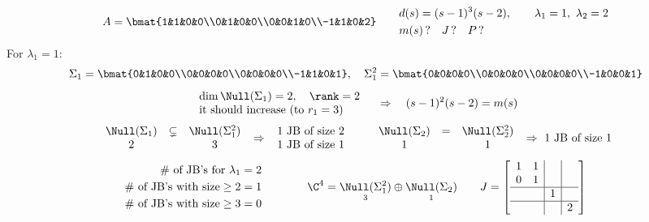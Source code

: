 \begin{example}
\[
A=\bmat{1&1&0&0\\0&1&0&0\\0&0&1&0\\-1&1&0&2}
\qquad
\begin{aligned}
&d(s)=(s-1)^3(s-2),\qquad \lambda_1=1,\ \lambda_2=2\\
&m(s)\,?\quad J\,?\quad P\,?
\end{aligned}
\]
For $\lambda_1=1$:
\[
\Sigma_1=\bmat{0&1&0&0\\0&0&0&0\\0&0&0&0\\-1&1&0&1},
\quad
\Sigma_1^2=\bmat{0&0&0&0\\0&0&0&0\\0&0&0&0\\-1&0&0&1}
\]
\[
\begin{array}{l}\dim\Null(\Sigma_1)=2,\quad \rank=2\\ \text{it should increase (to }r_1=3)\end{array}
\quad\Rightarrow\quad (s-1)^2(s-2)=m(s)
\]
\[
\begin{array}{ccc}
\Null(\Sigma_1)&\subsetneq&\Null(\Sigma_1^2)\\
2&&3
\end{array}
\ \Rightarrow\
\begin{array}{l}
\text{1 JB of size 2}\\ \text{1 JB of size 1}
\end{array}
\qquad
\begin{array}{ccc}
\Null(\Sigma_2)&=&\Null(\Sigma_2^2)\\
1&&1
\end{array}
\ \Rightarrow\ \text{1 JB of size 1}
\]
\[
\begin{aligned}
\#\text{ of JB's for }\lambda_1&=2\\
\#\text{ of JB's with size}\geq2&=1\\
\#\text{ of JB's with size}\geq3&=0
\end{aligned}
\qquad\qquad
\C^4=\underset{3}{\Null(\Sigma_1^2)}\oplus\underset{1}{\Null(\Sigma_2)}
\qquad
J=\left[\begin{array}{cc|c|c}1&1&&\\0&1&&\\\hline &&1&\\\hline &&&2\end{array}\right]
\]


\end{example}
